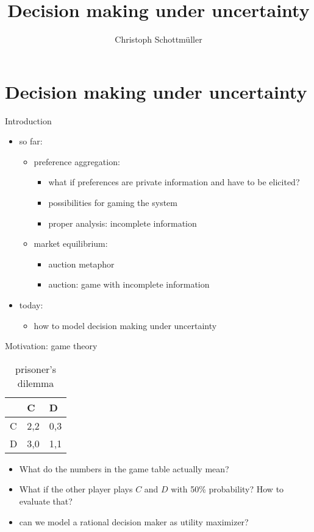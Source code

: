 \documentclass[bigger]{beamer}
\author{Christoph Schottmüller}
\date{}
\title{Decision making under uncertainty}
\begin{document}
\maketitle

\section{Decision making under uncertainty}
\label{sec:org4b72ef1}
\begin{frame}[label={sec:orgaac82f5}]{Introduction}
\begin{itemize}
\item so far:
\begin{itemize}
\item preference aggregation:
\begin{itemize}
\item what if preferences are private information and have to be elicited?
\item possibilities for gaming the system
\item proper analysis: incomplete information
\end{itemize}
\item market equilibrium:
\begin{itemize}
\item auction metaphor
\item auction: game with incomplete information
\end{itemize}
\end{itemize}
\item today:
\begin{itemize}
\item how to model decision making under uncertainty
\end{itemize}
\end{itemize}
\end{frame}
\begin{frame}[label={sec:org5dae677}]{Motivation: game theory}
  \begin{table}[h]
\centering
\begin{tabular}{l|l|l}
       & C & D\\ \hline
C   &2,2   & 0,3   \\
D   &3,0   & 1,1  
\end{tabular}
\caption{prisoner's dilemma}
\label{tab:pris_dil}
\end{table}
\begin{itemize}
\item What do the numbers in the game table actually mean?
\item What if the other player plays \(C\) and \(D\) with 50\% probability? How to evaluate that?
\item can we model a rational decision maker as utility maximizer?
\end{itemize}
\end{frame}
\end{document}
